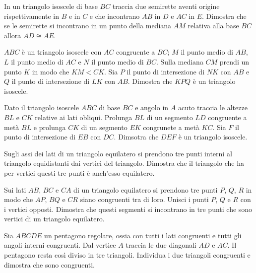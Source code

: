 \begin{multicols}{2}
\begin{esercizio}
\label{ese:2.90}
In un triangolo isoscele di base \(BC\) traccia due semirette aventi 
origine rispettivamente in \(B\) e in \(C\) e che incontrano \(AB\) in \(D\) 
e \(AC\) in \(E\). Dimostra che se le semirette si incontrano in un punto 
della mediana \(AM\) relativa alla base \(BC\) allora \(AD\cong AE\).
\end{esercizio}

\begin{esercizio}
\label{ese:2.91}
\(ABC\) è un triangolo isoscele con \(AC\) congruente a \(BC\); \(M\) il 
punto medio di \(AB\), \(L\) il punto medio di \(AC\) e \(N\) il punto medio 
di \(BC\). Sulla mediana \(CM\) prendi un punto \(K\) in modo che \(KM<CK\). 
Sia \(P\) il punto di intersezione di \(NK\) con \(AB\) e \(Q\) il punto di 
intersezione di \(LK\) con \(AB\). Dimostra che \(KPQ\) è un triangolo 
isoscele.
\end{esercizio}

\begin{esercizio}
\label{ese:2.92}
Dato il triangolo isoscele \(ABC\) di base \(BC\) e angolo in \(A\) acuto 
traccia le altezze \(BL\) e \(CK\) relative ai lati obliqui. Prolunga 
\(BL\) di un segmento \(LD\) congruente a metà \(BL\) e prolunga \(CK\) di un 
segmento \(EK\) congrunete a metà \(KC\). Sia \(F\) il punto di 
intersezione di \(EB\) con \(DC\). Dimsotra che \(DEF\) è un triangolo 
isoscele.
\end{esercizio}

\begin{esercizio}
\label{ese:2.93}
Sugli assi dei lati di un triangolo equilatero si prendono tre punti 
interni al triangolo equidistanti dai vertici del triangolo. Dimostra 
che il triangolo che ha per vertici questi tre punti è anch'esso 
equilatero.
\end{esercizio}

\begin{esercizio}
\label{ese:2.94}
Sui lati \(AB\), \(BC\) e \(CA\) di un triangolo equilatero si prendono tre 
punti \(P\), \(Q\), \(R\) in modo che \(AP\), \(BQ\) e \(CR\) siano congruenti 
tra di loro. Unisci i punti \(P\), \(Q\) e \(R\) con i vertici opposti. 
Dimostra che questi segmenti si incontrano in tre punti che sono 
vertici di un triangolo equilatero.
\end{esercizio}

\begin{esercizio}
\label{ese:2.95}
Sia \(ABCDE\) un pentagono regolare, ossia con tutti i lati congruenti 
e tutti gli angoli interni congruenti. Dal vertice \(A\) traccia le due 
diagonali \(AD\) e \(AC\). Il pentagono resta così diviso in tre 
triangoli. Individua i due triangoli congruenti e dimostra che sono 
congruenti.
\end{esercizio}


\end{multicols}

